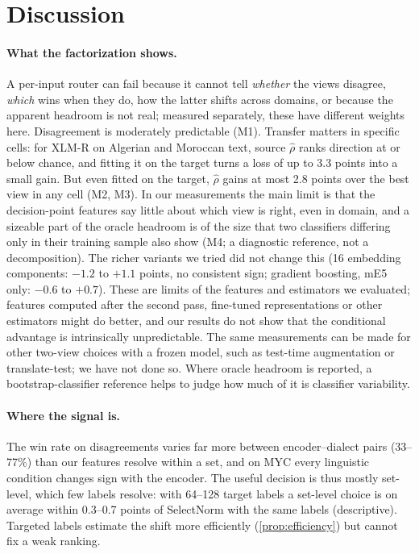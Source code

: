 \section{Discussion}
\label{sec:discussion}

\paragraph{What the factorization shows.}
A per-input router can fail because it cannot tell \emph{whether} the views disagree, \emph{which} wins when they do, how the latter shifts across domains, or because the apparent headroom is not real; measured separately, these have different weights here. Disagreement is moderately predictable (M1). Transfer matters in specific cells: for XLM-R on Algerian and Moroccan text, source $\hat\rho$ ranks direction at or below chance, and fitting it on the target turns a loss of up to 3.3 points into a small gain. But even fitted on the target, $\hat\rho$ gains at most 2.8 points over the best view in any cell (M2, M3). In our measurements the main limit is that the decision-point features say little about which view is right, even in domain, and a sizeable part of the oracle headroom is of the size that two classifiers differing only in their training sample also show (M4; a diagnostic reference, not a decomposition). The richer variants we tried did not change this (16 embedding components: $-1.2$ to $+1.1$ points, no consistent sign; gradient boosting, mE5 only: $-0.6$ to $+0.7$). These are limits of the features and estimators we evaluated; features computed after the second pass, fine-tuned representations or other estimators might do better, and our results do not show that the conditional advantage is intrinsically unpredictable. The same measurements can be made for other two-view choices with a frozen model, such as test-time augmentation or translate-test; we have not done so. Where oracle headroom is reported, a bootstrap-classifier reference helps to judge how much of it is classifier variability.

\paragraph{Where the signal is.}
The win rate on disagreements varies far more between encoder--dialect pairs (33--77\%) than our features resolve within a set, and on MYC every linguistic condition changes sign with the encoder. The useful decision is thus mostly set-level, which few labels resolve: with 64--128 target labels a set-level choice is on average within 0.3--0.7 points of SelectNorm with the same labels (descriptive). Targeted labels estimate the shift more efficiently (\cref{prop:efficiency}) but cannot fix a weak ranking.

